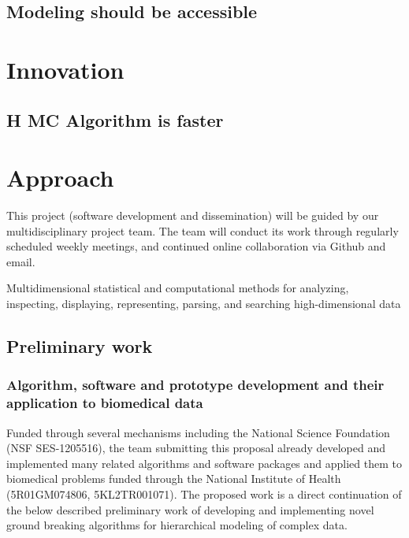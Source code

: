 \documentclass[11pt,notitlepage]{article}
\begin{document}
\subsection*{Modeling should be accessible}

\section*{Innovation}

\subsection*{H MC Algorithm is faster}

\section*{Approach}
This project (software development and dissemination) will be guided by our multidisciplinary project team. The team will conduct its work through regularly scheduled weekly meetings, and continued online collaboration via Github and email. 

Multidimensional statistical and computational methods for analyzing, inspecting, displaying, representing, parsing, and searching high-dimensional data

\subsection*{Preliminary work}

  

\subsubsection*{Algorithm, software and prototype development and their application to biomedical data}
Funded through several mechanisms including the National Science Foundation (NSF SES-1205516), the team submitting this proposal already developed and implemented many related algorithms and software packages and applied them to biomedical problems funded through the National Institute of Health (5R01GM074806, 5KL2TR001071). The proposed work is a direct continuation of the below described preliminary work of developing and implementing novel ground breaking algorithms for hierarchical modeling of complex data.
\end{document}
